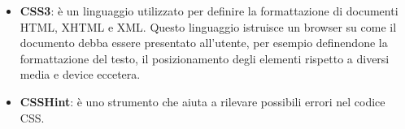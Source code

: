 \begin{itemize}
	\item
	\textbf{CSS3}: è un linguaggio utilizzato per definire la formattazione di documenti HTML, XHTML e XML.
	Questo linguaggio istruisce un browser su come il documento debba essere presentato all'utente, per esempio definendone la formattazione del testo, il posizionamento degli elementi rispetto a diversi media e device eccetera.
	\item
	\textbf{CSSHint}: è uno strumento che aiuta a rilevare possibili errori nel codice CSS.
\end{itemize}